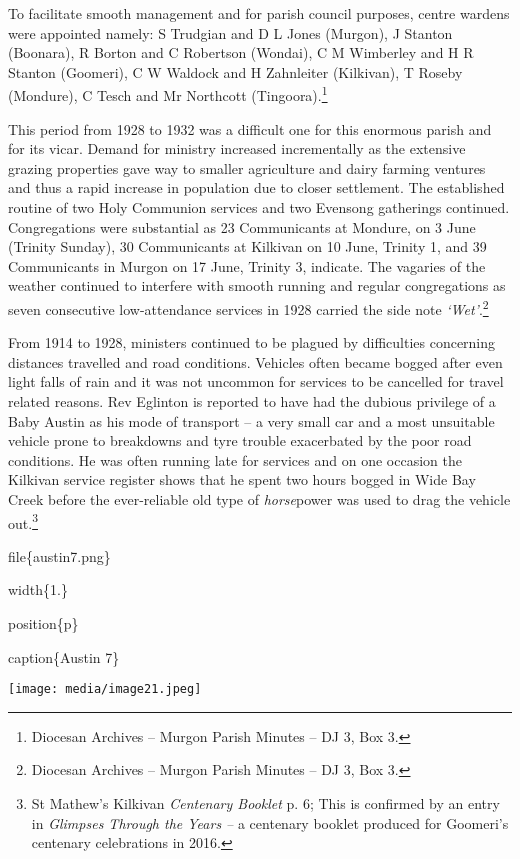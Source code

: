 To facilitate smooth management and for parish council purposes, centre wardens were appointed namely: S Trudgian and D L Jones (Murgon), J Stanton (Boonara), R Borton and C Robertson (Wondai), C M Wimberley and H R Stanton (Goomeri), C W Waldock and H Zahnleiter (Kilkivan), T Roseby (Mondure), C Tesch and Mr Northcott (Tingoora).\footnote{Diocesan Archives -- Murgon Parish Minutes -- DJ 3, Box 3.}

This period from 1928 to 1932 was a difficult one for this enormous parish and for its vicar. Demand for ministry increased incrementally as the extensive grazing properties gave way to smaller agriculture and dairy farming ventures and thus a rapid increase in population due to closer settlement. The established routine of two Holy Communion services and two Evensong gatherings continued. Congregations were substantial as 23 Communicants at Mondure, on 3 June (Trinity Sunday), 30 Communicants at Kilkivan on 10 June, Trinity 1, and 39 Communicants in Murgon on 17 June, Trinity 3, indicate. The vagaries of the weather continued to interfere with smooth running and regular congregations as seven consecutive low-attendance services in 1928 carried the side note \emph{`Wet'}.\footnote{Diocesan Archives -- Murgon Parish Minutes -- DJ 3, Box 3.}

From 1914 to 1928, ministers continued to be plagued by difficulties concerning distances travelled and road conditions. Vehicles often became bogged after even light falls of rain and it was not uncommon for services to be cancelled for travel related reasons. Rev Eglinton is reported to have had the dubious privilege of a Baby Austin as his mode of transport -- a very small car and a most unsuitable vehicle prone to breakdowns and tyre trouble exacerbated by the poor road conditions. He was often running late for services and on one occasion the Kilkivan service register shows that he spent two hours bogged in Wide Bay Creek before the ever-reliable old type of \emph{horse}power was used to drag the vehicle out.\footnote{St Mathew's Kilkivan \emph{Centenary Booklet} p. 6; This is confirmed by an entry in \emph{Glimpses Through the Years --} a centenary booklet produced for Goomeri's centenary celebrations in 2016.}

file\{austin7.png\}

width\{1.\}

position\{p\}

caption\{Austin 7\}

\texttt{[image: media/image21.jpeg]}

